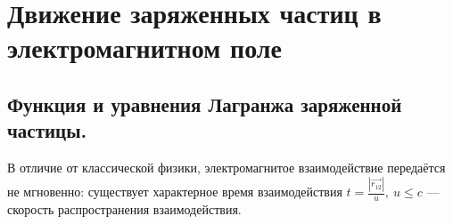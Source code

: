 \newpage
\section{Движение заряженных частиц в электромагнитном поле}
\subsection{Функция и уравнения Лагранжа заряженной частицы.}
    \begin{figure}[h]
        \centering
        
    \end{figure}
    В отличие от классической физики, электромагнитое взаимодействие передаётся не мгновенно: существует
    характерное время взаимодействия $t = \frac{\left|\vec{r_{12}} \right|}{u}, \ u \leqslant c$ --- скорость распространения взаимодействия.

